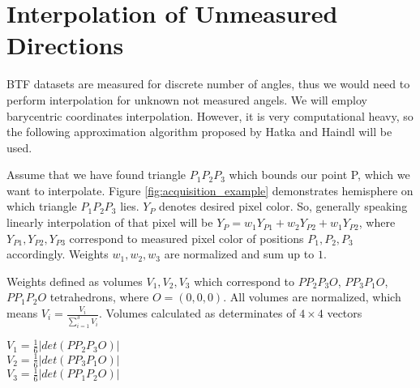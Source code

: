\chapter{Interpolation of Unmeasured Directions}
\label{chapter:interpolation}


BTF datasets are measured for discrete number of angles, thus we would need to perform interpolation for unknown not measured angels.
We will employ barycentric coordinates interpolation. 
However, it is very computational heavy, so the following approximation algorithm proposed by Hatka and Haindl \cite{btfblender} will be used.

Assume that we have found triangle $P_{1}P_{2}P_{3}$ which bounds our point P, which we want to interpolate. Figure \ref{fig:acquisition_example} demonstrates hemisphere on which triangle $P_{1}P_{2}P_{3}$ lies.
$Y_{P}$ denotes desired pixel color. 
So, generally speaking linearly interpolation of that pixel will be $Y_{P}=w_{1}Y_{P1} + w_{2}Y_{P2} + w_{1}Y_{P2}$, 
where $Y_{P1},Y_{P2},Y_{P3}$ correspond to measured pixel color of positions $P_{1},P_{2},P_{3}$ accordingly. Weights $w_{1},w_{2},w_{3}$ are normalized and sum up to $1$.

Weights defined as volumes $V_{1},V_{2},V_{3}$ which correspond to $PP_{2}P_{3}O$, $PP_{3}P_{1}O$, $PP_{1}P_{2}O$ tetrahedrons, where $O=(0,0,0)$.
All volumes are normalized, which means $V_{i}=\frac{V_{i}}{\sum_{i=1}^{3}V_{i}}$. Volumes calculated as determinates of $4\times 4$ vectors

{\centering $V_{1}=\frac{1}{6}\left | det(PP_{2}P_{3}O) \right |$ \\}
{\centering $V_{2}=\frac{1}{6}\left | det(PP_{3}P_{1}O) \right |$ \\}
{\centering $V_{3}=\frac{1}{6}\left | det(PP_{1}P_{2}O) \right |$ \\}